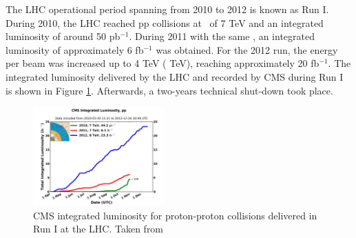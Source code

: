 The LHC operational period spanning from 2010 to 2012 is known as Run I. During 2010, the LHC 
reached pp collisions at \centermassenergy~of 7 TeV and an integrated luminosity of around 
50 pb$^{-1}$. During 2011 with the same \centermassenergy, an integrated luminosity of approximately 
6 fb$^{-1}$ was obtained. For the 2012 run, the energy per beam was increased 
up to 4 TeV ( TeV), reaching approximately 20 fb$^{-1}$. The integrated luminosity delivered 
by the LHC and recorded by CMS during Run I is shown in Figure \ref{figchp2:luminosityRunI}. Afterwards, a two-years
technical shut-down took place. \\

\begin{figure}[ht]
    \begin{center}
      \includegraphics[width=0.45\textwidth]{figuras/Chapter2/CMSluminosityRunI.jpg}
      \caption{CMS integrated luminosity for proton-proton collisions delivered
      in Run I at the LHC. Taken from \cite{chp2:LHCluminosity}}
     \label{figchp2:luminosityRunI}
    \end{center}
\end{figure}


